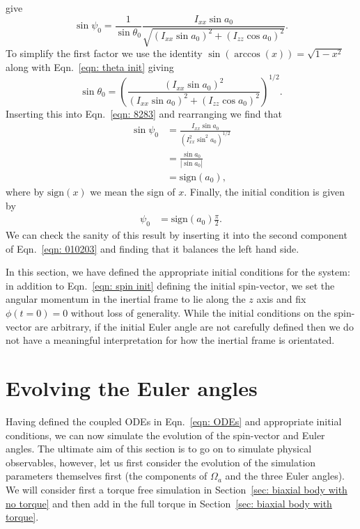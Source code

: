 \documentclass[../full_thesis/full_thesis.tex]{subfiles}
\begin{document}
give
\begin{equation}
\sin\psi_{0} =\frac{1}{ \sin\theta_{0}}
\frac{ I_{xx}\sin a_{0}}{\sqrt{(I_{xx}\sin a_{0})^{2} + (I_{zz}\cos a_{0})^{2}}}.
\label{eqn: 8283}
\end{equation}
To simplify the first factor we use the identity $\sin(\arccos(x)) = \sqrt{1 - x^{2}}$
along with Eqn.~\eqref{eqn:  theta init} giving
\begin{equation}
\sin\theta_{0} = \left(\frac{(I_{xx}\sin a_{0})^{2}}
                  {(I_{xx}\sin a_{0})^{2} + (I_{zz}\cos a_{0})^{2}} \right)^{1/2}.
\end{equation}
Inserting this into Eqn.~\eqref{eqn: 8283} and rearranging we find that
\begin{align}
\sin \psi_0 & = \frac{I_{xx} \sin a_{0}}{\left(I_{xx}^{2} \sin^{2} a_{0}\right)^{1/2}} \\
 & = \frac{\sin a_{0} }{|\sin a_{0}|} \\
& = \mathrm{sign}(a_{0}),
\end{align}
where by $\mathrm{sign}(x)$ we mean the sign of $x$. Finally, the initial
condition is given by
\begin{align}
\psi_{0} & =\mathrm{sign}(a_{0}) \frac{\pi}{2}.
\label{eqn: psi  init}
\end{align}
We can check the sanity of this result by inserting it into the second component of
Eqn.~\eqref{eqn: 010203} and finding that it balances the left hand side.

In this section, we have defined the appropriate initial conditions for the
system: in addition to Eqn.~\eqref{eqn: spin init} defining the initial spin-vector,
we set the angular momentum in the inertial frame to lie along the
$z$ axis and fix $\phi(t=0)=0$ without loss of generality.  While the
initial conditions on the spin-vector are arbitrary, if the initial Euler angle
are not carefully defined then we do not have a meaningful interpretation for
how the inertial frame is orientated.

\section{Evolving the Euler angles}
\label{sec: evolving the euler angles}

Having defined the coupled ODEs in Eqn.~\eqref{eqn: ODEs} and appropriate
initial conditions, we can now simulate the evolution of the spin-vector and
Euler angles. The ultimate aim of this section is to go on to simulate physical
observables, however, let us first consider the evolution of the simulation
parameters themselves first (the components of $\Omega_a$ and the three Euler
angles). We will consider first a torque free simulation in Section~\ref{sec:
biaxial body with no torque} and then add in the full torque in Section~\ref{sec:
biaxial body with torque}.
\end{document}
